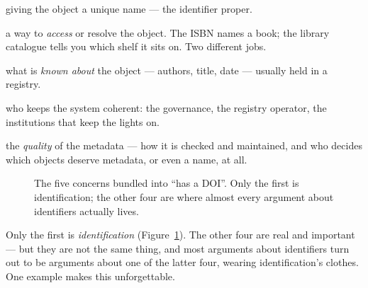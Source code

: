 \begin{description}[leftmargin=!,labelwidth=2.5cm,font=\bfseries\sffamily]
  \item[Identification] giving the object a unique name --- the identifier proper.
  \item[Location] a way to \emph{access} or resolve the object. The ISBN names a book; the library
        catalogue tells you which shelf it sits on. Two different jobs.
  \item[Metadata] what is \emph{known about} the object --- authors, title, date --- usually held
        in a registry.
  \item[Organization] who keeps the system coherent: the governance, the registry operator, the
        institutions that keep the lights on.
  \item[Curation] the \emph{quality} of the metadata --- how it is checked and maintained, and who
        decides which objects deserve metadata, or even a name, at all.
\end{description}

\begin{figure}[htbp]
  \centering
  \caption[Five concerns behind one word]{The five concerns bundled into \enquote{has a DOI}. Only
  the first is identification; the other four are where almost every argument about identifiers
  actually lives.}
  \label{fig:five-concerns}
\end{figure}

Only the first is \emph{identification} (Figure~\ref{fig:five-concerns}). The other four are real
and important --- but they are not the same thing, and most arguments about identifiers turn out to
be arguments about one of the latter four, wearing identification's clothes. One example makes this
unforgettable.

